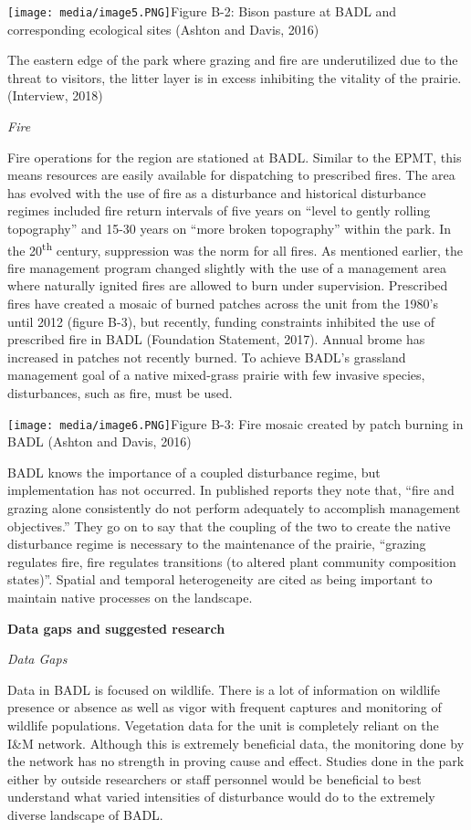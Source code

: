 \texttt{[image: media/image5.PNG]}Figure
B-2: Bison pasture at BADL and corresponding ecological sites (Ashton
and Davis, 2016)

The eastern edge of the park where grazing and fire are underutilized due to the threat to visitors, the litter layer is in excess inhibiting the vitality of the prairie. (Interview, 2018)

\emph{Fire }

Fire operations for the region are stationed at BADL.
Similar to the EPMT, this means resources are easily available for dispatching to prescribed fires. 
The area has evolved with the use of fire as a disturbance and historical disturbance regimes included fire return
intervals of five years on ``level to gently rolling topography'' and 15-30 years on ``more broken topography'' within the park. 
In the 20\textsuperscript{th} century, suppression was the norm for all fires.
As mentioned earlier, the fire management program changed slightly with the use of a management area where naturally ignited fires are allowed to burn under supervision.
Prescribed fires have created a mosaic of burned patches across the unit from the 1980's until 2012 (figure B-3), but recently, funding constraints inhibited the use of prescribed fire in BADL (Foundation Statement, 2017). 
Annual brome has increased in patches not recently burned. 
To achieve BADL's grassland management goal of a native mixed-grass prairie with few invasive species, disturbances, such as fire, must be used.

\texttt{[image: media/image6.PNG]}Figure
B-3: Fire mosaic created by patch burning in BADL (Ashton and Davis,
2016)

BADL knows the importance of a coupled disturbance regime, but
implementation has not occurred. In published reports they note that,
``fire and grazing alone consistently do not perform adequately to
accomplish management objectives.'' They go on to say that the coupling
of the two to create the native disturbance regime is necessary to the
maintenance of the prairie, ``grazing regulates fire, fire regulates
transitions (to altered plant community composition states)''. Spatial
and temporal heterogeneity are cited as being important to maintain
native processes on the landscape.

\textbf{Data gaps and suggested research}

\emph{Data Gaps}

Data in BADL is focused on wildlife. There is a lot of information on
wildlife presence or absence as well as vigor with frequent captures and
monitoring of wildlife populations. Vegetation data for the unit is
completely reliant on the I\&M network. Although this is extremely
beneficial data, the monitoring done by the network has no strength in
proving cause and effect. Studies done in the park either by outside
researchers or staff personnel would be beneficial to best understand
what varied intensities of disturbance would do to the extremely diverse
landscape of BADL.

